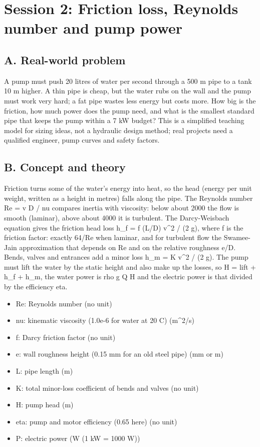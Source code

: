 \documentclass[11pt,a4paper]{article}
\begin{document}
\section{Session 2: Friction loss, Reynolds number and pump power}

\subsection*{A. Real-world problem}
A pump must push 20 litres of water per second through a 500 m pipe to a tank 10 m higher. A thin pipe is cheap, but the water rubs on the wall and the pump must work very hard; a fat pipe wastes less energy but costs more. How big is the friction, how much power does the pump need, and what is the smallest standard pipe that keeps the pump within a 7 kW budget? This is a simplified teaching model for sizing ideas, not a hydraulic design method; real projects need a qualified engineer, pump curves and safety factors.

\subsection*{B. Concept and theory}
Friction turns some of the water's energy into heat, so the head (energy per unit weight, written as a height in metres) falls along the pipe. The Reynolds number Re = v D / nu compares inertia with viscosity: below about 2000 the flow is smooth (laminar), above about 4000 it is turbulent. The Darcy-Weisbach equation gives the friction head loss h\_f = f (L/D) v\textasciicircum{}2 / (2 g), where f is the friction factor: exactly 64/Re when laminar, and for turbulent flow the Swamee-Jain approximation that depends on Re and on the relative roughness e/D. Bends, valves and entrances add a minor loss h\_m = K v\textasciicircum{}2 / (2 g). The pump must lift the water by the static height and also make up the losses, so H = lift + h\_f + h\_m, the water power is rho g Q H and the electric power is that divided by the efficiency eta.

\begin{itemize}[nosep]
\item Re: Reynolds number (no unit)
\item nu: kinematic viscosity (1.0e-6 for water at 20 C) (m\textasciicircum{}2/s)
\item f: Darcy friction factor (no unit)
\item e: wall roughness height (0.15 mm for an old steel pipe) (mm or m)
\item L: pipe length (m)
\item K: total minor-loss coefficient of bends and valves (no unit)
\item H: pump head (m)
\item eta: pump and motor efficiency (0.65 here) (no unit)
\item P: electric power (W (1 kW = 1000 W))
\end{itemize}
\end{document}
